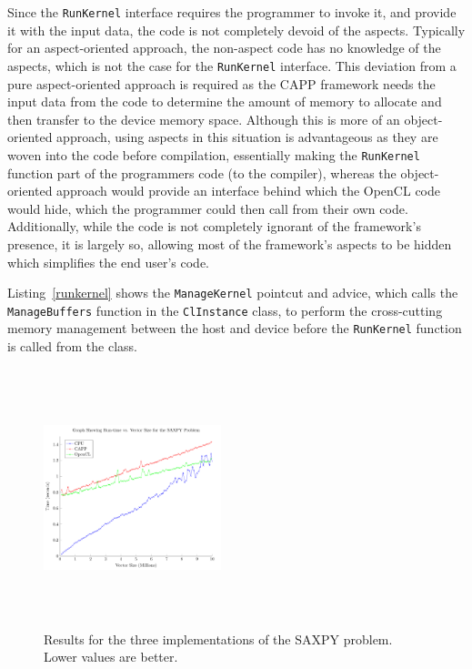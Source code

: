 \documentclass{sig-alternate-05-2015}
\begin{document}
Since the \lstinline$RunKernel$ interface requires the programmer to invoke it, and provide it with the input
data, the \CPP code
is not completely devoid of the aspects. Typically for an aspect-oriented approach, the non-aspect code has no
knowledge of the aspects, which is not the case for the \lstinline$RunKernel$ interface. This deviation from a
pure aspect-oriented approach is required as the CAPP framework needs the input data from
the \CPP code to determine the amount of memory to allocate and then transfer to the device memory
space. Although this is more of an object-oriented approach, using aspects in this situation is advantageous
as they are woven into the code before compilation, essentially making the \lstinline$RunKernel$ function part
of the programmers \CPP code (to the compiler), whereas the object-oriented approach would provide an
interface behind which the OpenCL code would hide, which the programmer could then call from their own code.
Additionally, while the \CPP code is not completely ignorant of the framework's presence, it is largely so,
allowing most of the framework's aspects to be hidden which simplifies the end user's \CPP code.

Listing~\ref{runkernel} shows the \lstinline$ManageKernel$ pointcut and advice,
which calls the \lstinline$ManageBuffers$ function in the \lstinline$ClInstance$
class, to perform the cross-cutting memory management between the host and
device before the \lstinline$RunKernel$ function is called from the \CPP
class.

\begin{figure}[!t]
	\centering
	\includegraphics[height=7.5cm,width=0.46\textwidth]{Saxpy}
	\caption{Results for the three implementations of the SAXPY problem. Lower
	values are better.}
	\label{fig:saxpy}
\end{figure}
\end{document}
